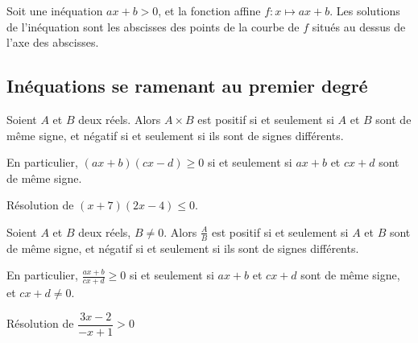 \begin{methode}
  Soit une inéquation $ax+b>0$, et la fonction affine $f:x\mapsto ax+b$. Les
  solutions de l'inéquation sont les abscisses des points de la courbe de $f$
  situés au dessus de l'axe des abscisses.
\end{methode}

\subsection{Inéquations se ramenant au premier degré}

\begin{propriete}
  Soient $A$ et $B$ deux réels. Alors $A\times B$ est positif si et seulement si $A$ et $B$ sont de même signe, et négatif si et seulement si ils sont de signes différents.

  En particulier, $(ax+b)(cx-d)\geq0$ si et seulement si $ax+b$ et $cx+d$ sont de même signe.
\end{propriete}

\begin{exemple}
  Résolution de $(x+7)(2x-4)\leq0$.
\end{exemple}

\begin{propriete}
  Soient $A$ et $B$ deux réels, $B\neq0$. Alors $\frac{A}{B}$ est positif si et seulement si $A$ et $B$ sont de même signe, et négatif si et seulement si ils sont de signes différents.

  En particulier, $\frac{ax+b}{cx+d}\geq0$ si et seulement si $ax+b$ et $cx+d$ sont de même signe, et $cx+d\neq0$.
\end{propriete}

\begin{exemple}
  Résolution de $\dfrac{3x-2}{-x+1}>0$
\end{exemple}
